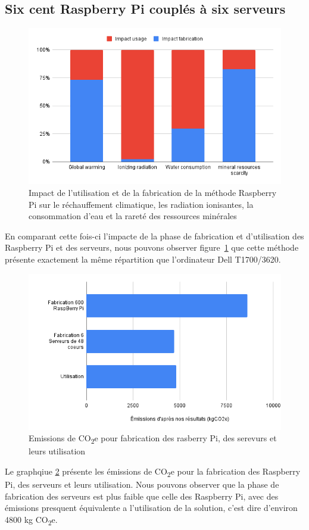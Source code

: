 \documentclass[12pt,a4paper]{paper}
\begin{document}
\subsection{Six cent Raspberry Pi couplés à six serveurs}
\begin{figure}[H]%
    \centering
    \includegraphics[width=\linewidth]{img/pi-server-usage-vs-fabrication.png}
    \caption{Impact de l'utilisation et de la fabrication de la méthode Raspberry Pi sur le réchauffement climatique, les radiation ionisantes, la consommation d'eau et la rareté des ressources minérales}
    \label{fig:pi-server-usage-vs-fabrication}
\end{figure}
En comparant cette fois-ci l'impacte de la phase de fabrication et d'utilisation des Raspberry Pi et des serveurs, nous pouvons observer figure~\ref{fig:pi-server-usage-vs-fabrication} que cette méthode présente exactement la même répartition que l'ordinateur Dell T1700/3620. 

\begin{figure}[H]%
    \centering
    \includegraphics[width=\linewidth]{img/graph-pi-server.png}
    \caption{Emissions de CO\textsubscript{2}e pour fabrication des rasberry Pi, des serevurs et leurs utilisation}
    \label{fig:graph-pi-server}
\end{figure}
Le graphqiue \ref{fig:graph-pi-server} présente les émissions de CO\textsubscript{2}e pour la fabrication des Raspberry Pi, des serveurs et leurs utilisation. Nous pouvons observer que la phase de fabrication des serveurs est plus faible que celle des Raspberry Pi, avec des émissions presquent équivalente a l'utilisation de la solution, c'est dire d'environ 4800 kg CO\textsubscript{2}e. 
\end{document}
